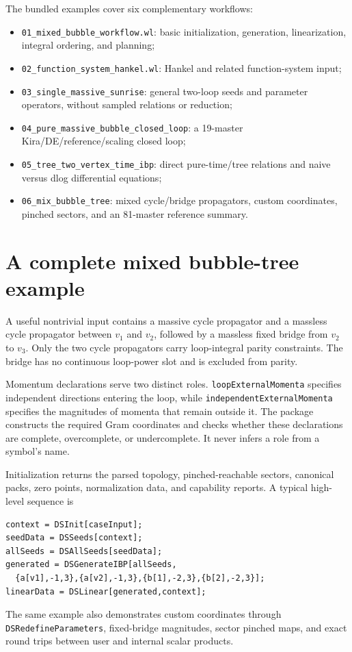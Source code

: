 ﻿\documentclass[a4paper,11pt]{article}
\begin{document}
The bundled examples cover six complementary workflows:
\begin{itemize}
  \item \texttt{01\_mixed\_bubble\_workflow.wl}: basic initialization, generation,
  linearization, integral ordering, and planning;
  \item \texttt{02\_function\_system\_hankel.wl}: Hankel and related function-system input;
  \item \texttt{03\_single\_massive\_sunrise}: general two-loop seeds and parameter operators,
  without sampled relations or reduction;
  \item \texttt{04\_pure\_massive\_bubble\_closed\_loop}: a 19-master Kira/DE/reference/scaling
  closed loop;
  \item \texttt{05\_tree\_two\_vertex\_time\_ibp}: direct pure-time/tree relations and
  naive versus dlog differential equations;
  \item \texttt{06\_mix\_bubble\_tree}: mixed cycle/bridge propagators, custom coordinates,
  pinched sectors, and an 81-master reference summary.
\end{itemize}

\section{A complete mixed bubble-tree example}

A useful nontrivial input contains a massive cycle propagator and a massless cycle
propagator between $v_1$ and $v_2$, followed by a massless fixed bridge from $v_2$ to $v_3$.
Only the two cycle propagators carry loop-integral parity constraints. The bridge has no
continuous loop-power slot and is excluded from parity.

Momentum declarations serve two distinct roles. \texttt{loopExternalMomenta} specifies
independent directions entering the loop, while \texttt{independentExternalMomenta}
specifies the magnitudes of momenta that remain outside it. The package constructs the
required Gram coordinates and checks whether these declarations are complete, overcomplete,
or undercomplete. It never infers a role from a symbol's name.

Initialization returns the parsed topology, pinched-reachable sectors, canonical packs,
zero points, normalization data, and capability reports. A typical high-level sequence is
\begin{verbatim}
context = DSInit[caseInput];
seedData = DSSeeds[context];
allSeeds = DSAllSeeds[seedData];
generated = DSGenerateIBP[allSeeds,
  {a[v1],-1,3},{a[v2],-1,3},{b[1],-2,3},{b[2],-2,3}];
linearData = DSLinear[generated,context];
\end{verbatim}
The same example also demonstrates custom coordinates through
\texttt{DSRedefineParameters}, fixed-bridge magnitudes, sector pinched maps, and exact
round trips between user and internal scalar products.
\end{document}
